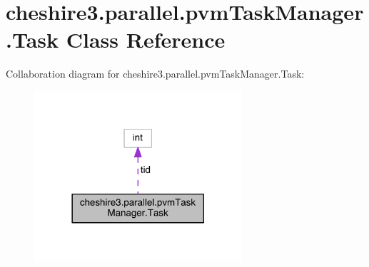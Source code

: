 \hypertarget{classcheshire3_1_1parallel_1_1pvm_task_manager_1_1_task}{\section{cheshire3.\-parallel.\-pvm\-Task\-Manager.\-Task Class Reference}
\label{classcheshire3_1_1parallel_1_1pvm_task_manager_1_1_task}
}


Collaboration diagram for cheshire3.\-parallel.\-pvm\-Task\-Manager.\-Task\-:
\nopagebreak
\begin{figure}[H]
\begin{center}
\leavevmode
\includegraphics[width=218pt]{classcheshire3_1_1parallel_1_1pvm_task_manager_1_1_task__coll__graph}
\end{center}
\end{figure}
